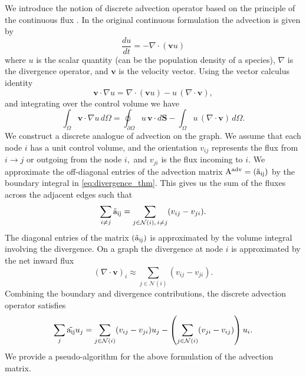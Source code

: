 \documentclass[12pt]{article}
\begin{document}
We introduce the notion of discrete advection operator based on the principle of the continuous flux \cite{carmona2025discrete}. In the original continuous formulation the advection is given by
\begin{equation}
    \frac{du}{dt} =-\nabla\cdot(\mathbf{v}u)
\end{equation}
where $u$ is the scalar quantity (can be the population density of a species), $\nabla$ is the divergence operator, and $\textbf{v}$ is the velocity vector. Using the vector calculus identity
\begin{equation}
\mathbf{v} \cdot \nabla u
=
\nabla \cdot ( \mathbf{v} u)
-
u \, (\nabla \cdot \mathbf{v}),
\label{eq:identity}
\end{equation}
and integrating over the control volume we have
\begin{equation}\label{eq:divergence_thm}
\int_{\Omega} \mathbf{v} \cdot \nabla u \, d\Omega
=
\oint_{\partial \Omega} u \, \mathbf{v} \cdot d\mathbf{S}
-
\int_{\Omega} u \, (\nabla \cdot \mathbf{v}) \, d\Omega.
\end{equation}
We construct a discrete analogue of advection on the graph. We assume that each node $i$ has a unit control volume, and the orientation $v_{ij}$ represents the flux from $i \rightarrow j$ or outgoing from the node $i,$ and $v_{ji}$ is the flux incoming to $i.$ We approximate the off-diagonal entries of the advection matrix $\mathrm{A^{adv}=(\Tilde{a}_{ij})}$ by the boundary integral in \eqref{eq:divergence_thm}. This gives us the sum of the fluxes across the adjacent edges such that 
\begin{equation}\label{eq:off_diagonal_entries_adv}
\sum_{i\ne j}\mathrm{\Tilde{a}_{ij}} = \sum_{j\in \mathcal{N}(i),\, i\ne j} (v_{ij} - v_{ji} ).   
\end{equation}
The diagonal entries of the matrix $(\mathrm{\Tilde{a}_{ij}})$ is approximated by the volume integral involving the divergence. On a graph the divergence at node $i$ is approximated by the net inward
flux 
\begin{equation*}\label{eq:diagonal_entries_adv}
(\nabla\cdot\mathbf{v})_i
\approx
\sum_{j \in \mathcal{N}(i)} (v_{ij} - v_{ji}).
\end{equation*}
Combining the boundary and divergence contributions, the discrete advection operator satisfies
\begin{equation}\label{eq:_Disc_Advection_operator}
\sum_j \mathrm{\Tilde{a_{ij}}}u_j
=
\sum_{j \in \mathcal{N}(i)} (v_{ij} - v_{ji}) u_j
-
\left(
\sum_{j \in \mathcal{N}(i)} (v_{ji} - v_{ij})
\right)
u_i.
\end{equation}
\noindent We provide a pseudo-algorithm for the above formulation of the advection matrix. 
\end{document}
